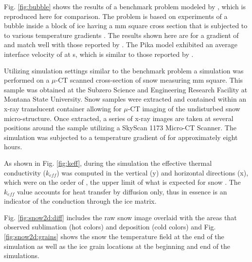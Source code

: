 Fig. \ref{fig:bubble} shows the results of a benchmark problem modeled by \citet{kaempfer2009phase}, which is reproduced here for comparison. The problem is based on experiments of a bubble inside a block of ice having a \unit[5]{mm} square cross section that is subjected to to various temperature gradients \citep{nakaya1956technical, stehle1965technical}. The results shown here are for a gradient of  and match well with those reported by \citet{kaempfer2009phase}. The Pika model exhibited an average interface velocity of  at \unit[7200]{s}, which is similar to those reported by \citet{kaempfer2009phase}.

Utilizing
simulation settings similar to the benchmark problem a simulation was performed on a $\mu$-CT scanned cross-section of snow measuring \unit[5]{mm} square. This sample was obtained at the Subzero Science and Engineering Research Facility at Montana State University. Snow samples were extracted and contained within an x-ray translucent container allowing for $\mu$-CT imaging of the undisturbed snow micro-structure.  Once extracted, a series of x-ray images are taken at several positions around the sample utilizing a SkyScan 1173 Micro-CT Scanner. The simulation was subjected to a temperature gradient of  for approximately eight hours.

As shown in Fig. \ref{fig:keff}, during the simulation the effective thermal conductivity ($k_{eff}$) was computed in the vertical (y) and horizontal directions (x), which were on the order of , the upper limit of what is expected for snow \citep{sturm1997thermal}. The $k_{eff}$ value accounts for heat transfer by diffusion only, thus in essence is an indicator of the conduction through the ice matrix.

Fig. \ref{fig:snow2d:diff} includes the raw snow image overlaid with the areas that observed sublimation (hot colors) and deposition (cold colors) and Fig. \ref{fig:snow2d:grains} shows the snow the temperature field at the end of the simulation as well as the ice grain locations at the beginning and end of the simulations.


